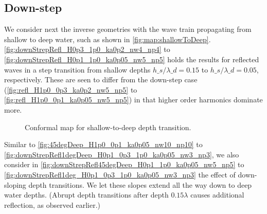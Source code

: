 


\subsection{Down-step}


We consider next the inverse geometries with the wave train propagating from shallow to deep water, such as shown in \autoref{fig:map:shallowToDeep}. 
\autoref{fig:downStrepRefl_H0p3_1p0_ka0p2_nw4_np4} to \ref{fig:downStrepRefl_H0p1_1p0_ka0p05_nw5_np5}
holds the results for reflected waves in a step transition from shallow depths $h\_s/\lambda\_d =0.15$ to $h\_s/\lambda\_d =0.05$, respectively.
These are seen to differ from the down-step case (\autoref{fig:refl_H1p0_0p3_ka0p2_nw5_np5} to \ref{fig:refl_H1p0_0p1_ka0p05_nw5_np5}) in that higher order harmonics dominate more.

\begin{figure}[H]%
\centering
{}%
%
\caption{Conformal map for shallow-to-deep depth transition.}%
\label{fig:map:shallowToDeep}%
\end{figure}




Similar to \autoref{fig:45degDeep_H1p0_0p1_ka0p05_nw10_np10} to \ref{fig:downStrepRefl1degDeep_H0p1_0p3_1p0_ka0p05_nw3_np3}, we also consider in \autoref{fig:downStrepRefl45degDeep_H0p1_1p0_ka0p05_nw5_np5} to \ref{fig:downStrepRefl1deg_H0p1_0p3_1p0_ka0p05_nw3_np3} the effect of down-sloping depth transitions.
We let these slopes extend all the way down to deep water depths. (Abrupt depth transitions after depth $0.15\lambda$ causes additional reflection, as observed earlier.)

